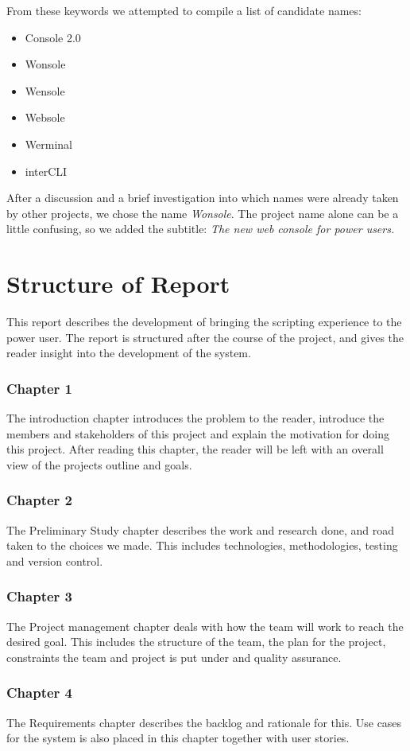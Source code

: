 From these keywords we attempted to compile a list of candidate names:
\begin{itemize}
\item Console 2.0
\item Wonsole
\item Wensole
\item Websole
\item Werminal
\item interCLI
\end{itemize}

After a discussion and a brief investigation into which names were already taken by other projects, we chose the name \emph{Wonsole}. The project name alone can be a little confusing, so we added the subtitle: \emph{The new web console for power users.}

\section{Structure of Report}
This report describes the development of bringing the scripting experience to the power user. 
The report is structured after the course of the project, and gives the reader insight into the development of the system. 
\subsubsection{Chapter 1}
The introduction chapter introduces the problem to the reader, introduce the members and stakeholders of this project and explain the motivation for doing this project. After reading this chapter, the reader will be left with an overall view of the projects outline and goals.
\subsubsection{Chapter 2}
The Preliminary Study chapter describes the work and research done, and road taken to the choices we made. This includes technologies, methodologies, testing and version control.
\subsubsection{Chapter 3}
The Project management chapter deals with how the team will work to reach the desired goal. This includes the structure of the team, the plan for the project, constraints the team and project is put under and quality assurance. 
\subsubsection{Chapter 4}
The Requirements chapter describes the backlog and rationale for this. Use cases for the system is also placed in this chapter together with user stories.
